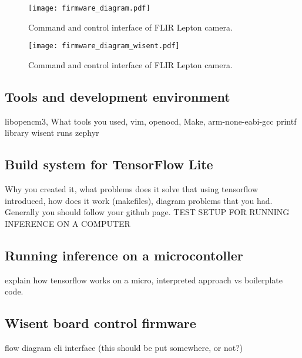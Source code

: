\begin{figure}[ht]
        \centering
        \texttt{[image: firmware\_diagram.pdf]} 
        \caption{ Command and control interface of FLIR Lepton camera.} 
        \label{firmware_diagram}
\end{figure}

\begin{figure}[ht]
        \centering
        \texttt{[image: firmware\_diagram\_wisent.pdf]} 
        \caption{ Command and control interface of FLIR Lepton camera.} 
        \label{firmware_diagram_wisent}
\end{figure}

\subsection{ Tools and development environment}
    libopencm3, 
    What tools you used, vim, openocd, Make, arm-none-eabi-gcc
    printf library
    wisent runs zephyr

\subsection{ Build system for TensorFlow Lite}
    Why you created it, 
    what problems does it solve that using tensorflow introduced, 
    how does it work (makefiles), diagram
    problems that you had. 
    Generally you should follow your github page. 
    TEST SETUP FOR RUNNING INFERENCE ON A COMPUTER

\subsection{ Running inference on a microcontoller}
    explain how tensorflow works on a micro, interpreted approach vs boilerplate code. 

\subsection{ Wisent board control firmware}
    flow diagram
    cli interface (this should be put somewhere, or not?)





